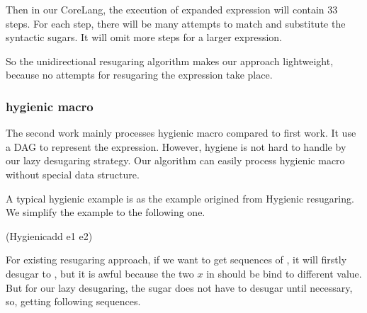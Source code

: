 Then in our CoreLang, the execution of expanded expression will contain 33 steps. For each step, there will be many attempts to match and substitute the syntactic sugars. It will omit more steps for a larger expression.

So the unidirectional resugaring algorithm makes our approach lightweight, because no attempts for resugaring the expression take place.
\subsubsection{hygienic macro}
\label{mark:hygienic}


The second work\cite{hygienic} mainly processes hygienic macro compared to first work. It use a DAG to represent the expression. However, hygiene is not hard to handle by our lazy desugaring strategy. Our algorithm can easily process hygienic macro without special data structure. 





A typical hygienic example is as the example origined from Hygienic resugaring\cite{hygienic}. We simplify the example to the following one. 
\begin{Codes}
	(Hygienicadd e1 e2) 
\end{Codes}

For existing resugaring approach, if we want to get sequences of , it will firstly desugar to , but it is awful because the two $x$ in  should be bind to different value. But for our lazy desugaring, the  sugar does not have to desugar until necessary, so, getting following sequences.

